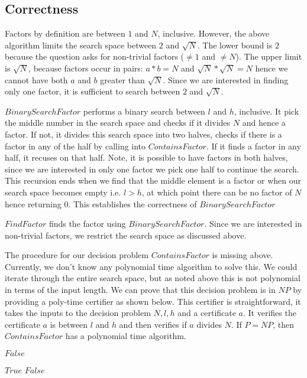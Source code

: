 \documentclass{article}
\begin{document}
    \subsection*{Correctness}
    Factors by definition are between $1$ and $N$, inclusive. However, the above algorithm limits the search space between $2$ and $\sqrt N$. The lower bound is $2$ because the question asks for non-trivial factors ($\ne 1$ and $\ne N$). The upper limit is $\sqrt N$, because factors occur in pairs: $a * b = N$ and $\sqrt N * \sqrt N = N$ hence we cannot have both $a$ and $b$ greater than $\sqrt N$. Since we are interested in finding only one factor, it is sufficient to search between $2$ and $\sqrt N$.

    $BinarySearchFactor$ performs a binary search between $l$ and $h$, inclusive. It pick the middle number in the search space and checks if it divides $N$ and hence a factor. If not, it divides this search space into two halves, checks if there is a factor in any of the half by calling into $ContainsFactor$. If it finds a factor in any half, it recuses on that half. Note, it is possible to have factors in both halves, since we are interested in only one factor we pick one half to continue the search. This recursion ends when we find that the middle element is a factor or when our search space becomes empty i.e. $l > h$, at which point there can be no factor of $N$ hence returning $0$. This establishes the correctness of $BinarySearchFactor$

    $FindFactor$ finds the factor using $BinarySearchFactor$. Since we are interested in non-trivial factors, we restrict the search space as discussed above.

    The procedure for our decision problem $ContainsFactor$ is missing above. Currently, we don't know any polynomial time algorithm to solve this. We could iterate through the entire search space, but as noted above this is not polynomial in terms of the input length. We can prove that this decision problem is in $NP$ by providing a poly-time certifier as shown below. This certifier is straightforward, it takes the inputs to the decision problem $N, l, h$ and a certificate $a$. It verifies the certificate $a$ is between $l$ and $h$ and then verifies if $a$ divides $N$. If $P = NP$, then $ContainsFactor$ has a polynomial time algorithm.

    \begin{algorithm}[H]
        \begin{algorithmic}
                    \State \Return $False$
                \EndIf

                    \State \Return $True$
                \Else
                    \State \Return $False$
                \EndIf
            \EndProcedure
        \end{algorithmic}
    \end{algorithm}
\end{document}
